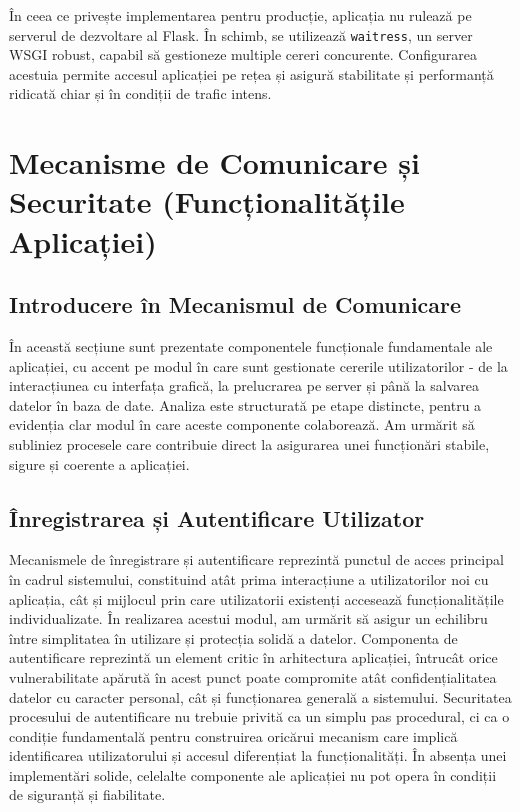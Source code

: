 \documentclass[12pt, a4paper, oneside, romanian]{teza-upb}
\begin{document}
În ceea ce privește implementarea pentru producție, aplicația nu rulează pe serverul de dezvoltare al Flask. În schimb, se utilizează \texttt{waitress}, un server WSGI robust, capabil să gestioneze multiple cereri concurente. Configurarea acestuia permite accesul aplicației pe rețea și asigură stabilitate și performanță ridicată chiar și în condiții de trafic intens.

\chapter {Mecanisme de Comunicare și Securitate (Funcționalitățile Aplicației)}

\section{Introducere în Mecanismul de Comunicare}

În această secțiune sunt prezentate componentele funcționale fundamentale ale aplicației, cu accent pe modul în care sunt gestionate cererile utilizatorilor - de la interacțiunea cu interfața grafică, la prelucrarea pe server și până la salvarea datelor în baza de date. Analiza este structurată pe etape distincte, pentru a evidenția clar modul în care aceste componente colaborează. Am urmărit să subliniez procesele care contribuie direct la asigurarea unei funcționări stabile, sigure și coerente a aplicației.

\section{Înregistrarea și Autentificare Utilizator}
Mecanismele de înregistrare și autentificare reprezintă punctul de acces principal în cadrul sistemului, constituind atât prima interacțiune a utilizatorilor noi cu aplicația, cât și mijlocul prin care utilizatorii existenți accesează funcționalitățile individualizate. În realizarea acestui modul, am urmărit să asigur un echilibru între simplitatea în utilizare și protecția solidă a datelor. Componenta de autentificare reprezintă un element critic în arhitectura aplicației, întrucât orice vulnerabilitate apărută în acest punct poate compromite atât confidențialitatea datelor cu caracter personal, cât și funcționarea generală a sistemului. Securitatea procesului de autentificare nu trebuie privită ca un simplu pas procedural, ci ca o condiție fundamentală pentru construirea oricărui mecanism care implică identificarea utilizatorului și accesul diferențiat la funcționalități. În absența unei implementări solide, celelalte componente ale aplicației nu pot opera în condiții de siguranță și fiabilitate.
\end{document}
